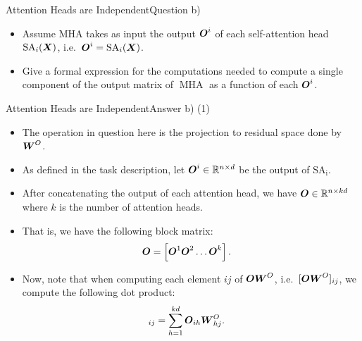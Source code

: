 \documentclass[t]{beamer}
\newcommand\op[1]{\operatorname{#1}}
\begin{document}
\begin{frame}{Attention Heads are Independent}{Question b)}
    \begin{itemize}
        \item Assume MHA takes as input the output ${\boldsymbol{O}}^i$ of each
              self-attention head
              $\op{SA}_i(\mX)$, i.e.\ $\mO^i = \op{SA}_i(\mX)$.
        \item Give a formal expression for the computations needed to compute a
              single component of the output matrix of $\op{MHA}$ as a function
              of each ${\boldsymbol{O}}^i$.
    \end{itemize}
\end{frame}

\begin{frame}{Attention Heads are Independent}{Answer b) (1)}
    \begin{itemize}
        \item The operation in question here is the projection to residual space
              done by ${\boldsymbol{W}}^O$.
        \item As defined in the task description, let
              ${\boldsymbol{O}}^i\in\mathbb{R}^{n\times d}$ be the output of $\op{SA_i}$.
        \item After concatenating the output of
              each attention head, we have ${\boldsymbol{O}}\in\mathbb{R}^{n\times kd}$ where $k$
              is the number of attention heads.
        \item That is, we have the following
              block matrix:
              \begin{align}
                  {\boldsymbol{O}} & = \left[{\boldsymbol{O}}^1 {\boldsymbol{O}}^2 \ldots {\boldsymbol{O}}^k\right].
              \end{align}
        \item Now, note that when computing each element $ij$ of ${\boldsymbol{O}}{\boldsymbol{W}}^O$,
              i.e.\ $[{\boldsymbol{O}}{\boldsymbol{W}}^O]_{ij}$, we compute the following dot product:
              \begin{align}
                  [\mO\mW^O]_{ij} & = \sum_{h=1}^{kd} \mO_{ih}\mW^O_{hj}.
              \end{align}
    \end{itemize}
\end{frame}
\end{document}
